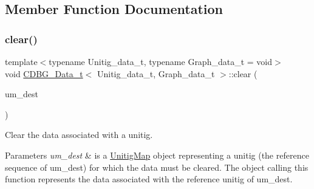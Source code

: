 \subsection{Member Function Documentation}
\mbox{\label{classCDBG__Data__t_ad3ee42fef3155251e54886f3649f72a2}} 
\subsubsection{\texorpdfstring{clear()}{clear()}}
{\footnotesize\ttfamily template$<$typename Unitig\+\_\+data\+\_\+t, typename Graph\+\_\+data\+\_\+t = void$>$ \\
void \hyperlink{classCDBG__Data__t}{C\+D\+B\+G\+\_\+\+Data\+\_\+t}$<$ Unitig\+\_\+data\+\_\+t, Graph\+\_\+data\+\_\+t $>$\+::clear (\begin{DoxyParamCaption}\item[{const \hyperlink{classUnitigMap}{Unitig\+Map}$<$ Unitig\+\_\+data\+\_\+t, Graph\+\_\+data\+\_\+t $>$ \&}]{um\+\_\+dest }\end{DoxyParamCaption})\hspace{0.3cm}{\ttfamily [inline]}}



Clear the data associated with a unitig. 


\begin{DoxyParams}{Parameters}
{\em um\+\_\+dest} & is a \hyperlink{classUnitigMap}{Unitig\+Map} object representing a unitig (the reference sequence of um\+\_\+dest) for which the data must be cleared. The object calling this function represents the data associated with the reference unitig of um\+\_\+dest. \\
\hline
\end{DoxyParams}
\mbox{\label{classCDBG__Data__t_a1d1eefcc5b100fbe000a5d70c4280aa3}} 
